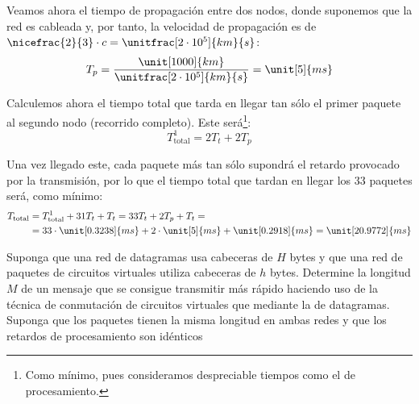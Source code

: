 \begin{ejercicio}
    Veamos ahora el tiempo de propagación entre dos nodos, donde suponemos que la red es cableada y, por tanto, la velocidad de propagación es de $\nicefrac{2}{3}\cdot c=\unitfrac[2\cdot 10^5]{km}{s}$:
    \begin{equation*}
        T_p = \frac{\unit[1000]{km}}{\unitfrac[2\cdot 10^5]{km}{s}} = \unit[5]{ms}
    \end{equation*}

    Calculemos ahora el tiempo total que tarda en llegar tan sólo el primer paquete al segundo nodo (recorrido completo). Este será\footnote{Como mínimo, pues consideramos despreciable tiempos como el de procesamiento.}:
    \begin{equation*}
        T_{\text{total}}^1 = 2T_t + 2T_p
    \end{equation*}

    Una vez llegado este, cada paquete más tan sólo supondrá el retardo provocado por la transmisión, por lo que el tiempo total que tardan en llegar los $33$ paquetes será, como mínimo:
    \begin{align*}
        T_{\text{total}} &= T_{\text{total}}^1 + 31T_t + T_t
        = 33T_t + 2T_p + T_t
        =\\&= 33\cdot \unit[0.3238]{ms} + 2\cdot \unit[5]{ms} + \unit[0.2918]{ms}
        = \unit[20.9772]{ms}
    \end{align*}
\end{ejercicio}

\begin{ejercicio}
    Suponga que una red de datagramas usa cabeceras de $H$ bytes y que una red de paquetes de circuitos virtuales utiliza cabeceras de $h$ bytes. Determine la longitud $M$ de un mensaje que se consigue transmitir más rápido haciendo uso de la técnica de conmutación de circuitos virtuales que mediante la de datagramas. Suponga que los paquetes tienen la misma longitud en ambas redes y que los retardos de procesamiento son idénticos
\end{ejercicio}

